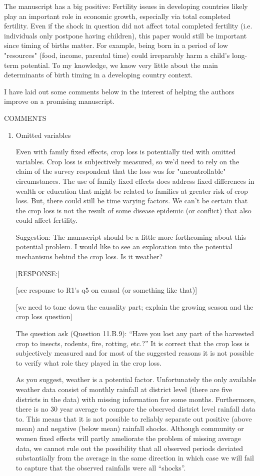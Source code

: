 \documentclass[letterpaper,12pt]{article}
\begin{document}
The manuscript has a big positive: Fertility issues in developing
countries likely play an important role in economic growth, especially
via total completed fertility. Even if the shock in question did not
affect total completed fertility (i.e. individuals only postpone having
children), this paper would still be important since timing of births
matter. For example, being born in a period of low "resources" (food,
income, parental time) could irreparably harm a child's long-term
potential. To my knowledge, we know very little about the main
determinants of birth timing in a developing country context.

I have laid out some comments below in the interest of helping the
authors improve on a promising manuscript.


COMMENTS

\begin{enumerate}

\item Omitted variables

Even with family fixed effects, crop loss is potentially tied with
omitted variables. Crop loss is subjectively measured, so we'd need to
rely on the claim of the survey respondent that the loss was for
"uncontrollable" circumstances. The use of family fixed effects does
address fixed differences in wealth or education that might be related
to families at greater risk of crop loss. But, there could still be time
varying factors. We can't be certain that the crop loss is not the
result of some disease epidemic (or conflict) that also could affect
fertility.

Suggestion: The manuscript should be a little more forthcoming about
this potential problem. I would like to see an exploration into the
potential mechanisms behind the crop loss. Is it weather?

[RESPONSE:]

[see response to R1's q5 on causal (or something like that)]

[we need to tone down the causality part; explain the growing season and
the crop loss question]

The question ask (Question 11.B.9): ``Have you lost any part of the 
harvested crop to insects, rodents, fire, rotting, etc.?''
It is correct that the crop loss is subjectively measured and for
most of the suggested reasons it is not possible to verify what
role they played in the crop loss.

As you suggest, weather is a potential factor.
Unfortunately the only available weather data consist of monthly rainfall 
at district level (there are five districts in the data) with missing 
information for some months.
Furthermore, there is no 30 year average to compare the observed 
district level rainfall data to.
This means that it is not possible to reliably separate out positive 
(above mean) and negative (below mean) rainfall shocks.
Although community or women fixed effects will partly ameliorate the
problem of missing average data, we cannot rule out the possibility
that all observed periods deviated substantially from the average in 
the same direction in which case we will fail to capture that the observed
rainfalls were all ``shocks''.


\end{enumerate}
\end{document}
